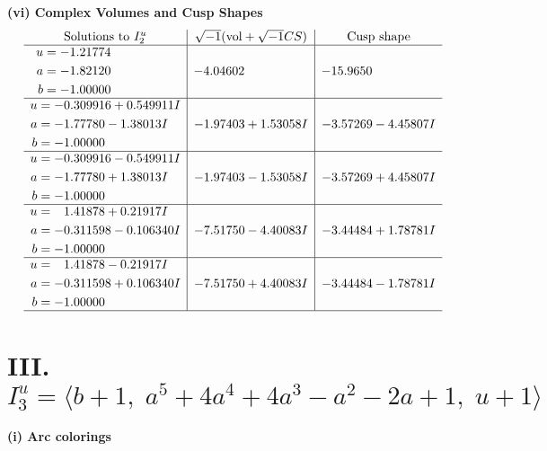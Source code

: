 \documentclass[1p]{elsarticle_modified}
\theoremstyle{definition}
\newcommand{\I}{\sqrt{-1}}
\begin{document}
\newpage\flushleft \textbf{(vi) Complex Volumes and Cusp Shapes}
$$\begin{array}{c|c|c}  
\text{Solutions to }I^u_{2}& \I (\text{vol} + \sqrt{-1}CS) & \text{Cusp shape}\\
 \hline 
\begin{aligned}
u &= -1.21774\phantom{ +0.000000I} \\
a &= -1.82120\phantom{ +0.000000I} \\
b &= -1.00000\phantom{ +0.000000I}\end{aligned}
 & -4.04602\phantom{ +0.000000I} & -15.9650\phantom{ +0.000000I} \\ \hline\begin{aligned}
u &= -0.309916 + 0.549911 I \\
a &= -1.77780 - 1.38013 I \\
b &= -1.00000\phantom{ +0.000000I}\end{aligned}
 & -1.97403 + 1.53058 I & -3.57269 - 4.45807 I \\ \hline\begin{aligned}
u &= -0.309916 - 0.549911 I \\
a &= -1.77780 + 1.38013 I \\
b &= -1.00000\phantom{ +0.000000I}\end{aligned}
 & -1.97403 - 1.53058 I & -3.57269 + 4.45807 I \\ \hline\begin{aligned}
u &= \phantom{-}1.41878 + 0.21917 I \\
a &= -0.311598 - 0.106340 I \\
b &= -1.00000\phantom{ +0.000000I}\end{aligned}
 & -7.51750 - 4.40083 I & -3.44484 + 1.78781 I \\ \hline\begin{aligned}
u &= \phantom{-}1.41878 - 0.21917 I \\
a &= -0.311598 + 0.106340 I \\
b &= -1.00000\phantom{ +0.000000I}\end{aligned}
 & -7.51750 + 4.40083 I & -3.44484 - 1.78781 I\\
 \hline 
 \end{array}$$\newpage\newpage\renewcommand{\arraystretch}{1}
\centering \section*{III. $I^u_{3}= \langle b+1,\;a^5+4 a^4+4 a^3- a^2-2 a+1,\;u+1 \rangle$}
\flushleft \textbf{(i) Arc colorings}\\
\end{document}
